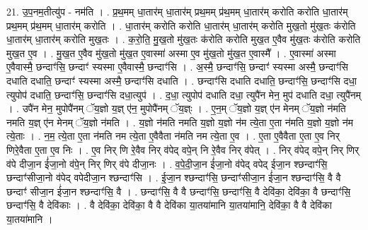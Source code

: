\documentclass[17pt]{extarticle}
\begin{document}
21. उ॒प॒नम॒तीत्यु॑प - नम॑ति । . प्र॒थ॒मम् धा॒तार॑म् धा॒तार॑म् प्रथ॒मम् प्र॑थ॒मम् धा॒तार॑म् करोति करोति धा॒तार॑म् प्रथ॒मम् प्र॑थ॒मम् धा॒तार॑म् करोति । . धा॒तार॑म् करोति करोति धा॒तार॑म् धा॒तार॑म् करोति मुख॒तो मु॑ख॒तः क॑रोति धा॒तार॑म् धा॒तार॑म् करोति मुख॒तः । . क॒रो॒ति॒ मु॒ख॒तो मु॑ख॒तः क॑रोति करोति मुख॒त ए॒वैव मु॑ख॒तः क॑रोति करोति मुख॒त ए॒व । . मु॒ख॒त ए॒वैव मु॑ख॒तो मु॑ख॒त ए॒वास्मा॑ अस्मा ए॒व मु॑ख॒तो मु॑ख॒त ए॒वास्मै᳚ । . ए॒वास्मा॑ अस्मा ए॒वैवास्मै॒ छन्दाꣳ॑सि॒ छन्दाꣳ॑ स्यस्मा ए॒वैवास्मै॒ छन्दाꣳ॑सि । . अ॒स्मै॒ छन्दाꣳ॑सि॒ छन्दाꣳ॑ स्यस्मा अस्मै॒ छन्दाꣳ॑सि दधाति दधाति॒ छन्दाꣳ॑ स्यस्मा अस्मै॒ छन्दाꣳ॑सि दधाति । . छन्दाꣳ॑सि दधाति दधाति॒ छन्दाꣳ॑सि॒ छन्दाꣳ॑सि दधा॒ त्युपोप॑ दधाति॒ छन्दाꣳ॑सि॒ छन्दाꣳ॑सि दधा॒त्युप॑ । . द॒धा॒ त्युपोप॑ दधाति दधा॒ त्युपै॑न मेन॒ मुप॑ दधाति दधा॒ त्युपै॑नम् । . उपै॑न मेन॒ मुपोपै॑नम् ॅय॒ज्ञो य॒ज्ञ् ए॑न॒ मुपोपै॑नम् ॅय॒ज्ञ्ः । . ए॒न॒म् ॅय॒ज्ञो य॒ज्ञ् ए॑न मेनम् ॅय॒ज्ञो न॑मति नमति य॒ज्ञ् ए॑न मेनम् ॅय॒ज्ञो न॑मति । . य॒ज्ञो न॑मति नमति य॒ज्ञो य॒ज्ञो न॑म त्ये॒ता ए॒ता न॑मति य॒ज्ञो य॒ज्ञो न॑म त्ये॒ताः । . न॒म॒ त्ये॒ता ए॒ता न॑मति नम त्ये॒ता ए॒वैवैता न॑मति नम त्ये॒ता ए॒व । . ए॒ता ए॒वैवैता ए॒ता ए॒व निर् णिरे॒वैता ए॒ता ए॒व निः । . ए॒व निर् णि रे॒वैव निर् व॑पेद् वपे॒न् नि रे॒वैव निर् व॑पेत् । . निर् व॑पेद् वपे॒न् निर् णिर् व॑पे दीजा॒न ई॑जा॒नो व॑पे॒न् निर् णिर् व॑पे दीजा॒नः । . व॒पे॒दी॒जा॒न ई॑जा॒नो व॑पेद् वपेद् ईजा॒न श्छन्दाꣳ॑सि॒ छन्दाꣳ॑सीजा॒नो व॑पेद् वपेदीजा॒न श्छन्दाꣳ॑सि । . ई॒जा॒न श्छन्दाꣳ॑सि॒ छन्दाꣳ॑सीजा॒न ई॑जा॒न श्छन्दाꣳ॑सि॒ वै वै छन्दाꣳ॑ सीजा॒न ई॑जा॒न श्छन्दाꣳ॑सि॒ वै । . छन्दाꣳ॑सि॒ वै वै छन्दाꣳ॑सि॒ छन्दाꣳ॑सि॒ वै देवि॑का॒ देवि॑का॒ वै छन्दाꣳ॑सि॒ छन्दाꣳ॑सि॒ वै देवि॑काः । . वै देवि॑का॒ देवि॑का॒ वै वै देवि॑का या॒तया॑मानि या॒तया॑मानि॒ देवि॑का॒ वै वै देवि॑का या॒तया॑मानि । \newline
\end{document}
